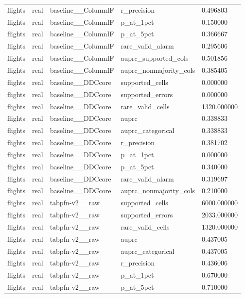 \begin{tabular}{lllll}
flights & real & baseline\_\_ColumnIF & r\_precision & 0.496803 \\
flights & real & baseline\_\_ColumnIF & p\_at\_1pct & 0.150000 \\
flights & real & baseline\_\_ColumnIF & p\_at\_5pct & 0.366667 \\
flights & real & baseline\_\_ColumnIF & rare\_valid\_alarm & 0.295606 \\
flights & real & baseline\_\_ColumnIF & auprc\_supported\_cols & 0.501856 \\
flights & real & baseline\_\_ColumnIF & auprc\_nonmajority\_cols & 0.385405 \\
flights & real & baseline\_\_DDCcore & supported\_cells & 0.000000 \\
flights & real & baseline\_\_DDCcore & supported\_errors & 0.000000 \\
flights & real & baseline\_\_DDCcore & rare\_valid\_cells & 1320.000000 \\
flights & real & baseline\_\_DDCcore & auprc & 0.338833 \\
flights & real & baseline\_\_DDCcore & auprc\_categorical & 0.338833 \\
flights & real & baseline\_\_DDCcore & r\_precision & 0.381702 \\
flights & real & baseline\_\_DDCcore & p\_at\_1pct & 0.000000 \\
flights & real & baseline\_\_DDCcore & p\_at\_5pct & 0.340000 \\
flights & real & baseline\_\_DDCcore & rare\_valid\_alarm & 0.319697 \\
flights & real & baseline\_\_DDCcore & auprc\_nonmajority\_cols & 0.210000 \\
flights & real & tabpfn-v2\_\_raw & supported\_cells & 6000.000000 \\
flights & real & tabpfn-v2\_\_raw & supported\_errors & 2033.000000 \\
flights & real & tabpfn-v2\_\_raw & rare\_valid\_cells & 1320.000000 \\
flights & real & tabpfn-v2\_\_raw & auprc & 0.437005 \\
flights & real & tabpfn-v2\_\_raw & auprc\_categorical & 0.437005 \\
flights & real & tabpfn-v2\_\_raw & r\_precision & 0.436006 \\
flights & real & tabpfn-v2\_\_raw & p\_at\_1pct & 0.670000 \\
flights & real & tabpfn-v2\_\_raw & p\_at\_5pct & 0.710000 \\

\end{tabular}
